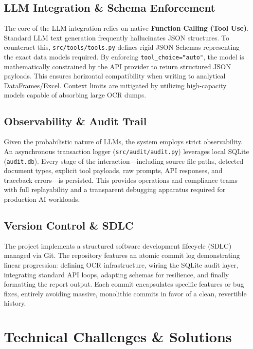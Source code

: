 \documentclass[11pt]{article}
\begin{document}
\subsection{LLM Integration \& Schema Enforcement}
The core of the LLM integration relies on native \textbf{Function Calling (Tool Use)}. Standard LLM text generation frequently hallucinates JSON structures. To counteract this, \texttt{src/tools/tools.py} defines rigid JSON Schemas representing the exact data models required. By enforcing \texttt{tool\_choice="auto"}, the model is mathematically constrained by the API provider to return structured JSON payloads. This ensures horizontal compatibility when writing to analytical DataFrames/Excel. Context limits are mitigated by utilizing high-capacity models capable of absorbing large OCR dumps.

\subsection{Observability \& Audit Trail}
Given the probabilistic nature of LLMs, the system employs strict observability. An asynchronous transaction logger (\texttt{src/audit/audit.py}) leverages local SQLite (\texttt{audit.db}). Every stage of the interaction---including source file paths, detected document types, explicit tool payloads, raw prompts, API responses, and traceback errors---is persisted. This provides operations and compliance teams with full replayability and a transparent debugging apparatus required for production AI workloads.

\subsection{Version Control \& SDLC}
The project implements a structured software development lifecycle (SDLC) managed via Git. The repository features an atomic commit log demonstrating linear progression: defining OCR infrastructure, wiring the SQLite audit layer, integrating standard API loops, adapting schemas for resilience, and finally formatting the report output. Each commit encapsulates specific features or bug fixes, entirely avoiding massive, monolithic commits in favor of a clean, revertible history.

\section{Technical Challenges \& Solutions}
\end{document}
